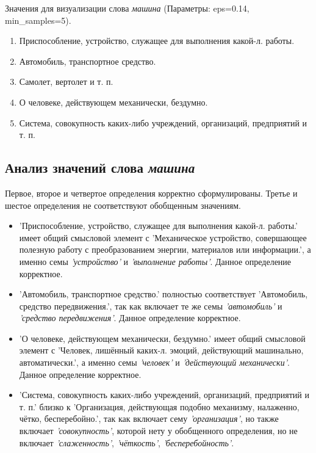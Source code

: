 Значения для визуализации слова \textit{машина} (Параметры: eps=0.14, min\_samples=5).

\begin{enumerate}
    \item Приспособление, устройство, служащее для выполнения какой-л. работы.
    \item Автомобиль, транспортное средство.
    \item Самолет, вертолет и т. п.
    \item О человеке, действующем механически, бездумно.
    \item Система, совокупность каких-либо учреждений, организаций, предприятий и т. п.
\end{enumerate}

\subsection*{Анализ значений слова \textit{машина}}

Первое, второе и четвертое определения корректно сформулированы.
Третье и шестое определения не соответствуют обобщенным значениям.

\begin{itemize}
    \item ’Приспособление, устройство, служащее для выполнения какой-л. работы.’ имеет общий смысловой элемент с
’Механическое устройство, совершающее полезную работу с преобразованием энергии, материалов или информации.’,
а именно семы \textit{’устройство’} и \textit{’выполнение работы’}.
Данное определение корректное.

    \item ’Автомобиль, транспортное средство.’ полностью соответствует
’Автомобиль, средство передвижения.’, так как включает те же семы \textit{’автомобиль’} и \textit{’средство передвижения’}.
Данное определение корректное.

    \item ’О человеке, действующем механически, бездумно.’ имеет общий смысловой элемент с
’Человек, лишённый каких-л. эмоций, действующий машинально, автоматически.’,
а именно семы \textit{’человек’} и \textit{’действующий механически’}.
Данное определение корректное.

    \item ’Система, совокупность каких-либо учреждений, организаций, предприятий и т. п.’ близко к
’Организация, действующая подобно механизму, налаженно, чётко, бесперебойно.’,
так как включает сему \textit{’организация’}, но также включает \textit{’совокупность’},
которой нету у обобщенного определения, но не включает \textit{’слаженность’}, \textit{’чёткость’}, \textit{’бесперебойность’}.%
\end{itemize}

